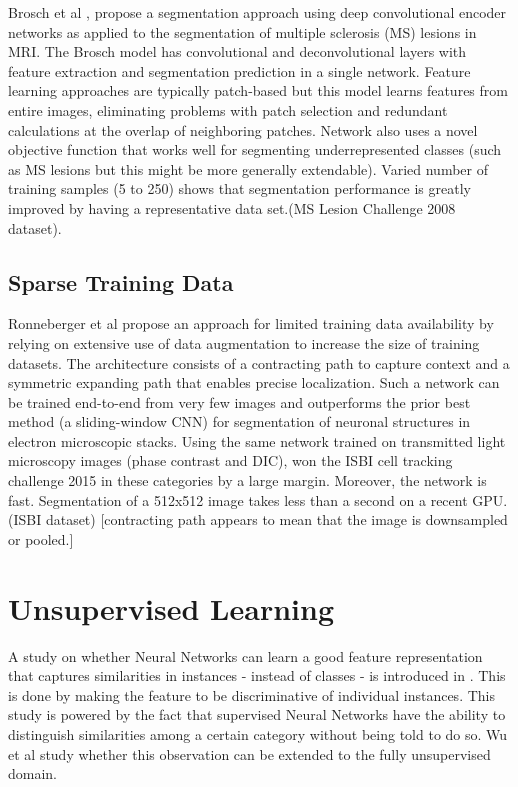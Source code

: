 \documentclass[letterpaper, 10 pt, conference]{ieeeconf}  %
\begin{document}
Brosch et al \cite{brosch_deep_2015}, propose a segmentation approach using deep convolutional encoder networks as applied to the segmentation of multiple sclerosis (MS) lesions in MRI. The Brosch model has convolutional and deconvolutional layers with feature extraction and segmentation prediction in a single network.  Feature learning approaches are typically patch-based but this model learns features from entire images, eliminating problems with patch selection and redundant calculations at the overlap of neighboring patches. Network also uses a novel objective function that works well for segmenting underrepresented classes (such as MS lesions but this might be more generally extendable). Varied number of training samples (5 to 250) shows that segmentation performance is greatly improved by having a representative data set.(MS Lesion Challenge 2008 dataset). 



\subsection{Sparse Training Data}

Ronneberger et al \cite{ronneberger_u-net:_2015} propose an approach for limited training data availability by relying on extensive use of data augmentation to increase the size of training datasets. The architecture consists of a contracting path to capture context and a symmetric expanding path that enables precise localization. Such a network can be trained end-to-end from very few images and outperforms the prior best method (a sliding-window CNN) for segmentation of neuronal structures in electron microscopic stacks. Using the same network trained on transmitted light microscopy images (phase contrast and DIC), won the ISBI cell tracking challenge 2015 in these categories by a large margin. Moreover, the network is fast. Segmentation of a 512x512 image takes less than a second on a recent GPU.  (ISBI dataset) [contracting path appears to mean that the image is downsampled or pooled.]

\section{Unsupervised Learning}

A study on whether Neural Networks can learn a good feature representation that captures similarities in instances - instead of classes - is introduced in \cite{Wu_2018_CVPR}. This is done by making the feature to be discriminative of individual instances. This study is powered by the fact that supervised Neural Networks have the ability to distinguish similarities among a certain category without being told to do so. Wu et al study whether this observation can be extended to the fully unsupervised domain. 
\end{document}
